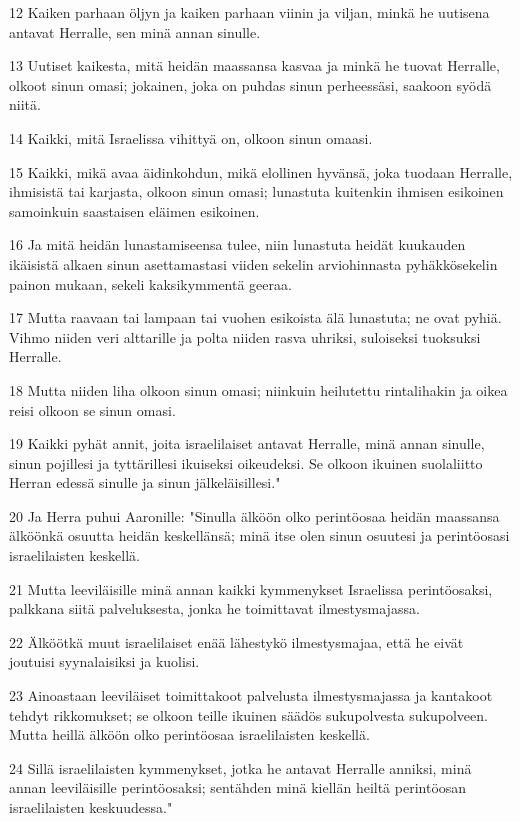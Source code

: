 \par 12 Kaiken parhaan öljyn ja kaiken parhaan viinin ja viljan, minkä he uutisena antavat Herralle, sen minä annan sinulle.
\par 13 Uutiset kaikesta, mitä heidän maassansa kasvaa ja minkä he tuovat Herralle, olkoot sinun omasi; jokainen, joka on puhdas sinun perheessäsi, saakoon syödä niitä.
\par 14 Kaikki, mitä Israelissa vihittyä on, olkoon sinun omaasi.
\par 15 Kaikki, mikä avaa äidinkohdun, mikä elollinen hyvänsä, joka tuodaan Herralle, ihmisistä tai karjasta, olkoon sinun omasi; lunastuta kuitenkin ihmisen esikoinen samoinkuin saastaisen eläimen esikoinen.
\par 16 Ja mitä heidän lunastamiseensa tulee, niin lunastuta heidät kuukauden ikäisistä alkaen sinun asettamastasi viiden sekelin arviohinnasta pyhäkkösekelin painon mukaan, sekeli kaksikymmentä geeraa.
\par 17 Mutta raavaan tai lampaan tai vuohen esikoista älä lunastuta; ne ovat pyhiä. Vihmo niiden veri alttarille ja polta niiden rasva uhriksi, suloiseksi tuoksuksi Herralle.
\par 18 Mutta niiden liha olkoon sinun omasi; niinkuin heilutettu rintalihakin ja oikea reisi olkoon se sinun omasi.
\par 19 Kaikki pyhät annit, joita israelilaiset antavat Herralle, minä annan sinulle, sinun pojillesi ja tyttärillesi ikuiseksi oikeudeksi. Se olkoon ikuinen suolaliitto Herran edessä sinulle ja sinun jälkeläisillesi."
\par 20 Ja Herra puhui Aaronille: "Sinulla älköön olko perintöosaa heidän maassansa älköönkä osuutta heidän keskellänsä; minä itse olen sinun osuutesi ja perintöosasi israelilaisten keskellä.
\par 21 Mutta leeviläisille minä annan kaikki kymmenykset Israelissa perintöosaksi, palkkana siitä palveluksesta, jonka he toimittavat ilmestysmajassa.
\par 22 Älköötkä muut israelilaiset enää lähestykö ilmestysmajaa, että he eivät joutuisi syynalaisiksi ja kuolisi.
\par 23 Ainoastaan leeviläiset toimittakoot palvelusta ilmestysmajassa ja kantakoot tehdyt rikkomukset; se olkoon teille ikuinen säädös sukupolvesta sukupolveen. Mutta heillä älköön olko perintöosaa israelilaisten keskellä.
\par 24 Sillä israelilaisten kymmenykset, jotka he antavat Herralle anniksi, minä annan leeviläisille perintöosaksi; sentähden minä kiellän heiltä perintöosan israelilaisten keskuudessa."

